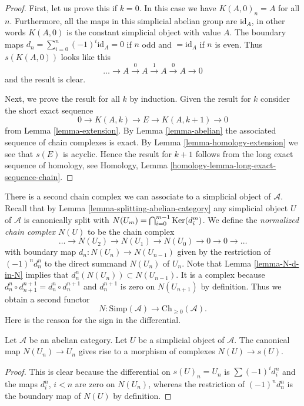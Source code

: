 \begin{proof}
First, let us prove this if $k = 0$.
In this case we have $K(A, 0)_n = A$ for all $n$.
Furthermore, all the maps in this simplicial abelian
group are $\text{id}_A$, in other words $K(A, 0)$
is the constant simplicial object with value $A$.
The boundary maps $d_n = \sum_{i = 0}^n (-1)^i \text{id}_A
= 0$ if $n$ odd and $ = \text{id}_A$ if $n$ is even.
Thus $s(K(A, 0))$ looks like this
$$
\ldots \to A \xrightarrow{0} A \xrightarrow{1} A \xrightarrow{0} A \to 0
$$
and the result is clear.

\medskip\noindent
Next, we prove the result for all $k$ by induction.
Given the result for $k$ consider the short exact sequence
$$
0 \to K(A, k) \to E \to K(A, k + 1) \to 0
$$
from Lemma \ref{lemma-extension}.
By Lemma \ref{lemma-abelian} the associated sequence of
chain complexes is exact.
By Lemma \ref{lemma-homology-extension} we see that
$s(E)$ is acyclic. Hence the result for $k + 1$
follows from the long exact sequence of homology,
see Homology, Lemma \ref{homology-lemma-long-exact-sequence-chain}.
\end{proof}

\noindent
There is a second chain complex we can associate to
a simplicial object of $\mathcal{A}$. Recall that by
Lemma \ref{lemma-splitting-abelian-category}
any simplicial object $U$ of $\mathcal{A}$
is canonically split with
$N(U_m) = \bigcap_{i = 0}^{m - 1} \mathop{\mathrm{Ker}}(d^m_i)$.
We define the {\it normalized chain complex $N(U)$}
to be the chain complex
$$
\ldots \to N(U_2) \to N(U_1) \to N(U_0) \to 0 \to 0 \to \ldots
$$
with boundary map $d_n : N(U_n) \to N(U_{n - 1})$ given
by the restriction of $(-1)^nd^n_n$ to the direct summand
$N(U_n)$ of $U_n$. Note that Lemma \ref{lemma-N-d-in-N}
implies that $d^n_n(N(U_n)) \subset N(U_{n - 1})$.
It is a complex because
$d^n_n \circ d^{n + 1}_{n + 1} = d^n_n \circ d^{n + 1}_n$
and $d^{n + 1}_n$ is zero on $N(U_{n + 1})$ by definition.
Thus we obtain a second functor
$$
N : \text{Simp}(\mathcal{A}) \longrightarrow \text{Ch}_{\geq 0}(\mathcal{A}).
$$
Here is the reason for the sign in the differential.

\begin{lemma}
\label{lemma-map-associated-complexes}
Let $\mathcal{A}$ be an abelian category.
Let $U$ be a simplicial object of $\mathcal{A}$.
The canonical map $N(U_n) \to U_n$ gives rise to
a morphism of complexes $N(U) \to s(U)$.
\end{lemma}

\begin{proof}
This is clear because the differential
on $s(U)_n = U_n$ is $\sum (-1)^i d^n_i$ and
the maps $d^n_i$, $i < n$ are zero on $N(U_n)$,
whereas the restriction of $(-1)^nd^n_n$ is the boundary
map of $N(U)$ by definition.
\end{proof}

